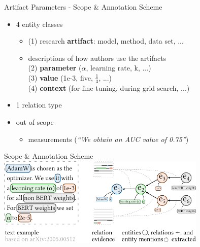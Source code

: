 \documentclass[en,16:9,smallfoot]{sdqbeamer}
\begin{document}
   \begin{frame}{Artifact Parameters - Scope \& Annotation Scheme}
   \begin{itemize}
       \item 4 entity classes
       \begin{itemize}
           \item (1) research \textbf{artifact}: model, method, data set, ...
           \item descriptions of how authors use the artifacts\\
                (2) \textbf{parameter} ($\alpha$, learning rate, k, ...)\\
                (3) \textbf{value} (1e-3, five, $\frac{1}{3}$, ...)\\
                (4) \textbf{context} (for fine-tuning, during grid search, ...)
       \end{itemize}
       \item 1 relation type
       \item out of scope
           \begin{itemize}
                \item measurements (\textit{``We obtain an AUC value of 0.75''})
           \end{itemize}
   \end{itemize}
   \end{frame}

   \begin{frame}{Scope \& Annotation Scheme}
       \centering
       \includegraphics[width=0.75\textwidth]{imgs/schema_visual_v3}
   \end{frame}
\end{document}
